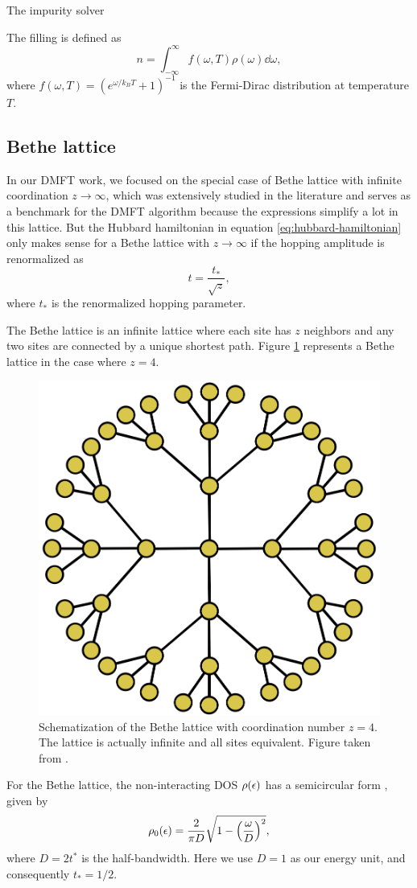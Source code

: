 \documentclass[12pt]{report}
\begin{document}
The impurity solver

The filling is defined as
$$
n = \int_{-\infty}^{\infty} f(\omega, T) \rho(\omega) \dd{\omega},
$$
where $f(\omega, T) = (e^{\omega/k_B T} + 1)^{-1}$ is the Fermi-Dirac distribution at temperature $T$.

\subsection{Bethe lattice} \label{sec:bethe}

In our DMFT work, we focused on the special case of Bethe lattice with infinite coordination $z\to\infty$, which was extensively studied in the literature \cite{georges1996, thesis_dmft_graz} and serves as a benchmark for the DMFT algorithm because the expressions simplify a lot in this lattice. But the Hubbard hamiltonian in equation \ref{eq:hubbard-hamiltonian} only makes sense for a Bethe lattice with $z\to\infty$ if the hopping amplitude is renormalized as \cite{thesis_bruno}
\begin{equation} \label{eq:hopping-renormalization}
t = \frac{t_*}{\sqrt{z}},
\end{equation}
where $t_*$ is the renormalized hopping parameter.

The Bethe lattice is an infinite lattice where each site has $z$ neighbors and any two sites are connected by a unique shortest path. Figure \ref{fig:bethe-lattice} represents a Bethe lattice in the case where $z = 4$.
\begin{figure}[H]
\centering
\includegraphics[width=0.4\linewidth]{fig/bethe-lattice.png}
\caption{Schematization of the Bethe lattice with coordination number $z = 4$. The lattice is actually infinite and all sites equivalent. Figure taken from \cite{thesis_dmft_graz}.}
\label{fig:bethe-lattice}
\end{figure}

For the Bethe lattice, the non-interacting DOS $\rho(\epsilon)$ has a semicircular form \cite{georges1996}, given by
\begin{equation} \label{eq:bethe-dos}
\rho_0(\epsilon) = \frac{2}{\pi D} \sqrt{1-\qty(\frac{\omega}{D})^2},
\end{equation}
where $D = 2t^*$ is the half-bandwidth. Here we use $D = 1$ as our energy unit, and consequently $t_* = 1/2$.
\end{document}
